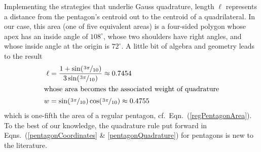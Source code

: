 Implementing the strategies that underlie Gauss quadrature, length $\ell$ represents a distance from the pentagon's centroid out to the centroid of a quadrilateral.  In our case, this area (one of five equivalent areas) is a four-sided polygon whose apex has an inside angle of $108^{\circ}$, whose two shoulders have right angles, and whose inside angle at the origin is $72^{\circ}$.  A little bit of algebra and geometry leads to the result
\begin{subequations}
    \label{pentagonQuadrature}
    \begin{align}
    \ell & = \frac{1 + \sin ( \textfrac{3\pi}{10} )}
    {3 \sin ( \textfrac{3\pi}{10} ) } \approx 0.7454 \\
    \intertext{whose area becomes the associated weight of quadrature}
    w & = \sin ( \textfrac{3\pi}{10} ) \cos ( \textfrac{3\pi}{10} ) 
    \approx 0.4755 
    \end{align}
\end{subequations}
which is one-fifth the area of a regular pentagon, cf.\ Eqn.~(\ref{regPentagonArea}).  To the best of our knowledge, the quadrature rule put forward in Eqns.~(\ref{pentagonCoordinates} \& \ref{pentagonQuadrature}) for pentagons is new to the literature. 

